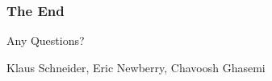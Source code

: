 %
%
%
%
%
%
%
%
%
%
%








\begin{frame}
	\frametitle{The End}
	\vspace{2cm}
	{\huge Any Questions?
	}
	\vspace{2.5cm}  
	\begin{flushright}  
		Klaus Schneider, Eric Newberry, Chavoosh Ghasemi \\
	\end{flushright}
\end{frame}
